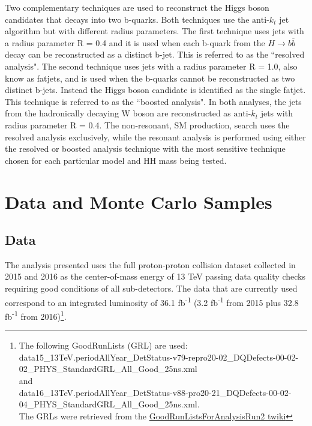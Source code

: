 
Two complementary techniques are used to reconstruct the Higgs boson candidates that decays into two b-quarks\cite{Aaboud:2018zhh}. Both techniques use the ${\textrm{anti-}k_{t}}$ jet algorithm but with different radius parameters. The first technique uses jets with a radius parameter R = 0.4 and it is used when each b-quark from the ${H\rightarrow b\overline{b}}$ decay can be reconstructed as a distinct b-jet. This is referred to as the ``resolved analysis"\cite{DiMicco:2151893}. The second technique uses jets with a radius parameter R = 1.0, also know as fatjets, and is used when the b-quarks cannot be reconstructed as two distinct b-jets. Instead the Higgs boson candidate is identified as the single fatjet. This technique is referred to as the ``boosted analysis"\cite{Issever:2276099}. In both analyses, the jets from the hadronically decaying W boson are reconstructed as ${\textrm{anti-}k_{t}}$ jets with radius parameter R = 0.4. The non-resonant, SM production, search uses the resolved analysis exclusively, while the resonant analysis is performed using either the resolved or boosted analysis technique with the most sensitive technique chosen for each particular model and HH mass being tested.
\section{Data and Monte Carlo Samples}
\subsection{Data}
\indent The analysis presented uses the full proton-proton collision dataset collected in 2015 and 2016 as the center-of-mass energy of 13 TeV passing data quality checks requiring good conditions of all sub-detectors. The data that are currently used correspond to an integrated luminosity of 36.1 fb\textsuperscript{-1} (3.2 fb\textsuperscript{-1} from 2015 plus 32.8 fb\textsuperscript{-1} from 2016)\footnote{The following GoodRunLists (GRL) are used:\\  
data15\_13TeV.periodAllYear\_DetStatus-v79-repro20-02\_DQDefects-00-02-02\_PHYS\_StandardGRL\_All\_Good\_25ns.xml\\
and\\
data16\_13TeV.periodAllYear\_DetStatus-v88-pro20-21\_DQDefects-00-02-04\_PHYS\_StandardGRL\_All\_Good\_25ns.xml.\\
The GRLs were retrieved from the \href{https://twiki.cern.ch/twiki/bin/view/AtlasProtected/GoodRunListsForAnalysisRun2}{GoodRunListsForAnalysisRun2 twiki}}.

